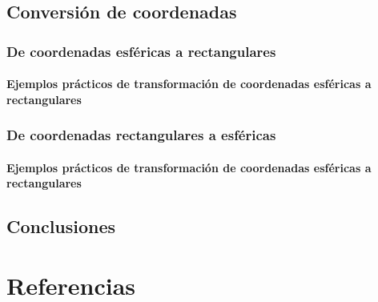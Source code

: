 \documentclass[letterpaper,14pt]{extreport} %
\begin{document}
    \section{Conversión de coordenadas}
      

      \subsection{De coordenadas esféricas a rectangulares}
          

          \subsubsection{Ejemplos prácticos de transformación de coordenadas esféricas a rectangulares}
          

      \subsection{De coordenadas rectangulares a esféricas}
          

          \subsubsection{Ejemplos prácticos de transformación de coordenadas esféricas a rectangulares}
          

    \section{Conclusiones}
      

  \chapter{Referencias}
    
\end{document}

